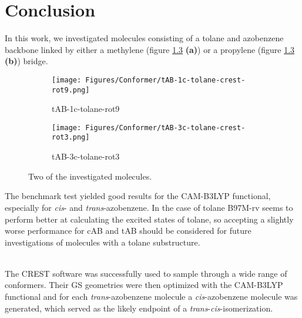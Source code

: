 \chapter{Conclusion}
In this work, we investigated molecules consisting of a tolane and azobenzene backbone
linked by either a methylene (figure \ref{fig:summary_total} \textbf{(a)}) or a propylene (figure \ref{fig:summary_total} \textbf{(b)}) bridge.
%
\begin{figure}[H]
\centering
\begin{subfigure}{.33\textwidth}
  \centering
  \texttt{[image: Figures/Conformer/tAB-1c-tolane-crest-rot9.png]}
  \caption{tAB-1c-tolane-rot9}
  \label{fig:summary_a}
\end{subfigure}
\begin{subfigure}{.33\textwidth}
  \centering
  \texttt{[image: Figures/Conformer/tAB-3c-tolane-crest-rot3.png]}
  \caption{tAB-3c-tolane-rot3}
  \label{fig:summary_b}
\end{subfigure}%
\caption{Two of the investigated molecules.}
\label{fig:summary_total}
\end{figure}
The benchmark test yielded good results for the CAM-B3LYP functional, especially for \textit{cis}- and \textit{trans}-azobenzene. In the case of tolane B97M-rv seems to perform better at calculating the excited states of tolane, so accepting a slightly worse performance for cAB and tAB should be considered for future investigations of molecules with a tolane substructure. 
%
\begin{comment}
- For cis and trans AB CAM-B3LYP performed quite well, but for tolane B97 seems to be the better functional

An alternative functional one could use would be the B97M-rV, since it performed espe-
cially well for tolane with some deficits concerning tAB.
\end{comment}
%
\\
The CREST software was successfully used to sample through a wide range of conformers. Their GS geometries were then optimized with the CAM-B3LYP functional and for each \textit{trans}-azobenzene molecule a \textit{cis}-azobenzene molecule was generated, which served as the likely endpoint of a \textit{trans}-\textit{cis}-isomerization. 
%
%
\begin{comment}
- we could successfully use CREST to sample through a wide range of conformers and could select those with the lowest energies
- those were used to construct the thermodynamical isomerisation of trans cis AB
\end{comment}


